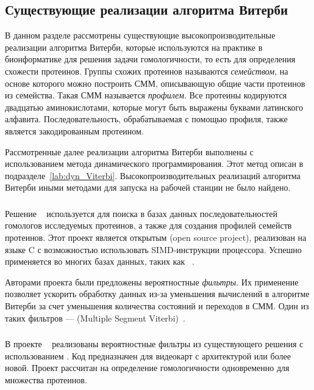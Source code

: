 \subsection{Существующие реализации алгоритма Витерби}
\label{lab:exist_Viterbi}
В данном разделе рассмотрены существующие 
высокопроизводительные реализации алгоритма Витерби, которые 
используются на практике в бионформатике для решения задачи 
гомологичности, то есть для определения схожести протеинов.
Группы схожих протеинов называются \emph{семейством},
на основе которого можно построить СММ, описывающую общие 
части протеинов из семейства.
Такая СММ называется \emph{профилем}.
Все протеины кодируются двадцатью аминокислотами, 
которые могут быть выражены буквами латинского алфавита.
Последовательность, обрабатываемая с помощью профиля, также 
является закодированным протеином.

Рассмотренные далее реализации алгоритма Витерби выполнены с 
использованием метода динамического программирования.
Этот метод описан в подразделе~\ref{lab:dyn_Viterbi}.
Высокопроизводительных реализаций алгоритма Витерби иными 
методами для запуска на рабочей станции не было найдено.

\subsubsection{}
\label{lab:HMMer}
Решение ~\cite{HMMer} используется для поиска в базах 
данных последовательностей гомологов исследуемых протеинов, а 
также для создания профилей семейств протеинов.
Этот проект является открытым (open source project), реализован  на языке C с возможностью
использовать SIMD-инструкции процессора.
Успешно применяется во многих базах данных, таких как ~\cite{Pfam}.

Авторами проекта были предложены вероятностные \emph{фильтры}.
Их применение позволяет ускорить обработку данных из-за 
уменьшения вычислений в алгоритме Витерби за счет уменьшения 
количества состояний и переходов в СММ.
Один из таких фильтров ---  (Multiple Segment 
Viterbi)~\cite{MSV_Eddy}.

\subsubsection{}
\label{lab:CUDAMPF}
В проекте ~\cite{cudampf} реализованы
вероятностные фильтры из существующего решения  с использованием 
.
Код предназначен для видеокарт  с 
архитектурой  или более новой.
Проект рассчитан на определение гомологичности одновременно 
для множества протеинов.

